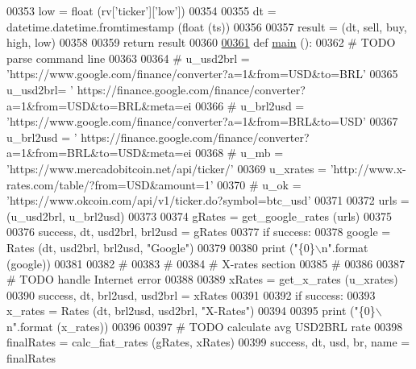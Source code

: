 \begin{DoxyCode}
{{{00353     low  = float (rv[\textcolor{stringliteral}{'ticker'}][\textcolor{stringliteral}{'low'}])
00354     
00355     dt = datetime.datetime.fromtimestamp (float (ts))
00356     
00357     result = (dt, sell, buy, high, low)
00358     
00359     \textcolor{keywordflow}{return} result
00360 
\hypertarget{exch2exch_8py_source.tex_l00361}{}\hyperlink{namespaceexch2exch_a4a7d6bc2c47add0970ca3e0c28a5cb63}{00361} \textcolor{keyword}{def }\hyperlink{namespaceexch2exch_a4a7d6bc2c47add0970ca3e0c28a5cb63}{main} ():
00362     \textcolor{comment}{# TODO parse command line }
00363 
00364     \textcolor{comment}{# u\_usd2brl = 'https://www.google.com/finance/converter?a=1&from=USD&to=BRL'}
00365     u\_usd2brl= \textcolor{stringliteral}{'
      https://finance.google.com/finance/converter?a=1&from=USD&to=BRL&meta=ei%
00366 \textcolor{comment}{#    u\_brl2usd = 'https://www.google.com/finance/converter?a=1&from=BRL&to=USD'}
00367     u\_brl2usd = \textcolor{stringliteral}{'
      https://finance.google.com/finance/converter?a=1&from=BRL&to=USD&meta=ei%
00368 \textcolor{comment}{#    u\_mb      = 'https://www.mercadobitcoin.net/api/ticker/'}
00369     u\_xrates  = \textcolor{stringliteral}{'http://www.x-rates.com/table/?from=USD&amount=1'}
00370 \textcolor{comment}{#    u\_ok      = 'https://www.okcoin.com/api/v1/ticker.do?symbol=btc\_usd'}
00371     
00372     urls = (u\_usd2brl, u\_brl2usd)
00373     
00374     gRates = get\_google\_rates (urls)
00375     
00376     success, dt, usd2brl, brl2usd = gRates
00377     \textcolor{keywordflow}{if} success:   
00378         google = Rates (dt, usd2brl, brl2usd, \textcolor{stringliteral}{"Google"})
00379     
00380         \textcolor{keywordflow}{print} (\textcolor{stringliteral}{"\{0\}\(\backslash\)n"}.format (google))
00381     
00382     \textcolor{comment}{#}
00383     \textcolor{comment}{#}
00384     \textcolor{comment}{# X-rates section }
00385     \textcolor{comment}{# }
00386     
00387     \textcolor{comment}{# TODO handle Internet error }
00388 
00389     xRates = get\_x\_rates (u\_xrates)
00390     success, dt, brl2usd, usd2brl = xRates
00391     
00392     \textcolor{keywordflow}{if} success:
00393         x\_rates = Rates (dt, brl2usd, usd2brl, \textcolor{stringliteral}{"X-Rates"})
00394     
00395         \textcolor{keywordflow}{print} (\textcolor{stringliteral}{"\{0\}\(\backslash\)n"}.format (x\_rates))
00396     
00397     \textcolor{comment}{# TODO calculate avg USD2BRL rate}
00398     finalRates = calc\_fiat\_rates (gRates, xRates)
00399     success, dt, usd, br, name = finalRates
}}}}}
\end{DoxyCode}

